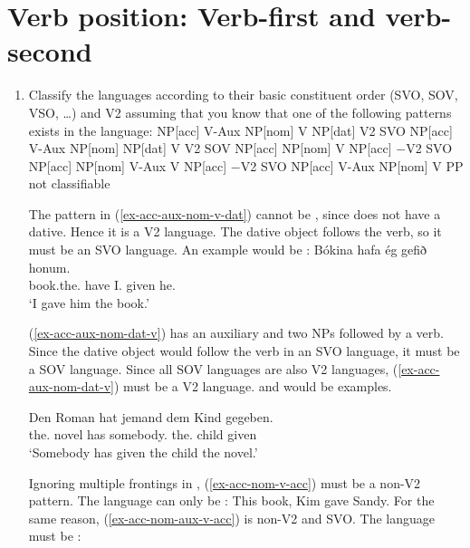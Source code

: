 \section{Verb position: Verb-first and verb-second}



\begin{enumerate}
\item Classify the  languages according to their basic constituent order (SVO, SOV, VSO,
  \ldots) and V2 assuming that you know that one of the following patterns exists in the language:
\eal
\label{ex-v2-task-solution}
\ex 
\label{ex-acc-aux-nom-v-dat}
NP[acc] V-Aux NP[nom] V NP[dat]   \hfill  V2 SVO 
\ex
\label{ex-acc-aux-nom-dat-v} 
NP[acc] V-Aux NP[nom] NP[dat] V   \hfill  V2 SOV
\ex 
\label{ex-acc-nom-v-acc}
NP[acc] NP[nom] V NP[acc]         \hfill $-$V2 SVO
\ex 
\label{ex-acc-nom-aux-v-acc}
NP[acc] NP[nom] V-Aux V NP[acc]   \hfill $-$V2 SVO
\ex 
\label{ex-acc-aux-nom-v-pp}
NP[acc] V-Aux NP[nom] V PP        \hfill not classifiable
\zl

\largerpage[1]
\noindent
The pattern in (\ref{ex-acc-aux-nom-v-dat}) cannot be , since  does not have a dative. Hence it is a V2
language. The dative object follows the verb, so it must be an SVO language. An example would be :
\ea
\gll Bókina          hafa ég       gefið honum.\\
     book.the.\ACC{} have I.\NOM{} given he.\DAT\\\icelandic
\glt `I gave him the book.'
\z

(\ref{ex-acc-aux-nom-dat-v}) has an auxiliary and two NPs followed by a verb. Since the dative object would follow the verb
in an SVO language, it must be a SOV language. Since all  SOV languages are also V2
languages, (\ref{ex-acc-aux-nom-dat-v}) must be a V2 language.  and  would be examples.

\ea
\gll Den Roman hat jemand dem Kind gegeben.\\
     the.\ACC{} novel has somebody.\NOM{} the.\DAT{} child given\\
\glt `Somebody has given the child the novel.'
\z

Ignoring multiple frontings in  \citep{Mueller2003b}, (\ref{ex-acc-nom-v-acc}) must be a non-V2 pattern. The language can only be
:
\ea
This book, Kim gave Sandy.
\z
For the same reason, (\ref{ex-acc-nom-aux-v-acc}) is non-V2 and SVO. The language must be :


\end{enumerate}
